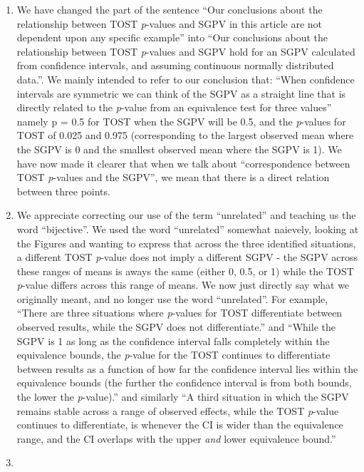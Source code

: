 \documentclass[man]{apa6}
\begin{document}
\begin{enumerate}
\def\labelenumi{\arabic{enumi}.}
\item
  We have changed the part of the sentence \enquote{Our conclusions about the relationship between TOST \emph{p}-values and SGPV in this article are not dependent upon any specific example} into \enquote{Our conclusions about the relationship between TOST \emph{p}-values and SGPV hold for an SGPV calculated from confidence intervals, and assuming continuous normally distributed data.}. We mainly intended to refer to our conclusion that: \enquote{When confidence intervals are symmetric we can think of the SGPV as a straight line that is directly related to the \emph{p}-value from an equivalence test for three values} namely p = 0.5 for TOST when the SGPV will be 0.5, and the \emph{p}-values for TOST of 0.025 and 0.975 (corresponding to the largest observed mean where the SGPV is 0 and the smallest observed mean where the SGPV is 1). We have now made it clearer that when we talk about \enquote{correspondence between TOST \emph{p}-values and the SGPV}, we mean that there is a direct relation between three points.
\item
  We appreciate correcting our use of the term \enquote{unrelated} and teaching us the word \enquote{bijective}. We used the word \enquote{unrelated} somewhat naievely, looking at the Figures and wanting to express that across the three identified situations, a different TOST \emph{p}-value does not imply a different SGPV - the SGPV across these ranges of means is aways the same (either 0, 0.5, or 1) while the TOST \emph{p}-value differs across this range of means. We now just directly say what we originally meant, and no longer use the word \enquote{unrelated}. For example, \enquote{There are three situations where \emph{p}-values for TOST differentiate between observed results, while the SGPV does not differentiate.} and \enquote{While the SGPV is 1 as long as the confidence interval falls completely within the equivalence bounds, the \emph{p}-value for the TOST continues to differentiate between results as a function of how far the confidence interval lies within the equivalence bounds (the further the confidence interval is from both bounds, the lower the \emph{p}-value).} and similarly \enquote{A third situation in which the SGPV remains stable across a range of observed effects, while the TOST \emph{p}-value continues to differentiate, is whenever the CI is wider than the equivalence range, and the CI overlaps with the upper \emph{and} lower equivalence bound.}
\item

\end{enumerate}
\end{document}
